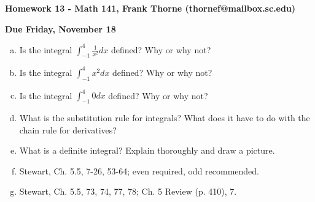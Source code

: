 \documentclass[12pt]{article}
\begin{document}
\setlength{\topmargin}{-2mm}





\begin{center}{\bf Homework 13 - Math 141, Frank Thorne (thornef@mailbox.sc.edu)}
\end{center}
\begin{center}
{\bf Due Friday, November 18}
\end{center}

\begin{enumerate}[(a)]
\item
Is the integral $\int_{-1}^4 \frac{1}{x^2} dx$ defined? Why or why not?

\item
Is the integral $\int_{-1}^4 x^2 dx$ defined? Why or why not?

\item
Is the integral $\int_{-1}^4 0 dx$ defined? Why or why not?

\item
What is the substitution rule for integrals? What does it have to do with the chain rule
for derivatives?

\item
What is a definite integral? Explain thoroughly and draw a picture.

\item
Stewart, Ch. 5.5, 7-26, 53-64; even required, odd recommended.

\item
Stewart, Ch. 5.5, 73, 74, 77, 78; Ch. 5 Review (p. 410), 7.

\end{enumerate}
\end{document}
